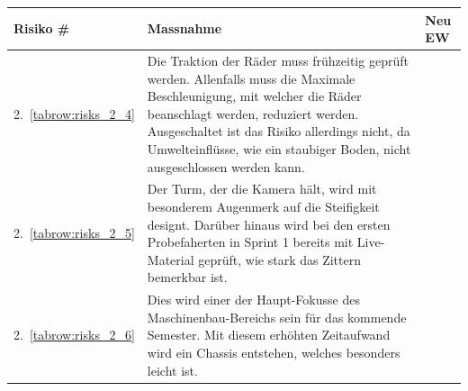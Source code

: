 \documentclass[main.tex]{subfiles} %
\begin{document}
\begin{table}[H]
    \begin{tabularx}{\textwidth}{|>{\centering\arraybackslash}p{2cm}|>{\raggedright\arraybackslash}X|>{\centering\arraybackslash}p{0.75cm}|}
        \hline
        \textbf{Risiko \#}        & \textbf{Massnahme}
                                  & \textbf{Neu EW}                                                                                                                                                                                                                                                                               \\
        \hline
        \rowcolor{yellow!30}
        2.~\ref{tabrow:risks_2_4} & Die Traktion der Räder muss frühzeitig geprüft werden. Allenfalls muss die Maximale Beschleunigung, mit welcher die Räder beanschlagt werden, reduziert werden. Ausgeschaltet ist das Risiko allerdings nicht, da Umwelteinflüsse, wie ein staubiger Boden, nicht ausgeschlossen werden kann.
                                  & 3                                                                                                                                                                                                                                                                                             \\
        \hline
        \rowcolor{green!30}
        2.~\ref{tabrow:risks_2_5} & Der Turm, der die Kamera hält, wird mit besonderem Augenmerk auf die Steifigkeit designt. Darüber hinaus wird bei den ersten Probefaherten in Sprint 1 bereits mit Live-Material geprüft, wie stark das Zittern bemerkbar ist.
                                  & 2                                                                                                                                                                                                                                                                                             \\
        \hline
        \rowcolor{green!30}
        2.~\ref{tabrow:risks_2_6} & Dies wird einer der Haupt-Fokusse des Maschinenbau-Bereichs sein für das kommende Semester. Mit diesem erhöhten Zeitaufwand wird ein Chassis entstehen, welches besonders leicht ist.
                                  & 1                                                                                                                                                                                                                                                                                             \\
        \hline


\end{tabularx}
\end{table}
\end{document}
